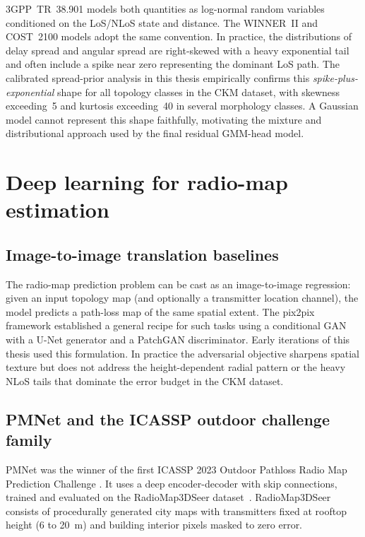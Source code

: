 3GPP~TR~38.901 \cite{tr38901} models both quantities as log-normal random
variables conditioned on the LoS/NLoS state and distance.  The WINNER~II and
COST~2100 models adopt the same convention.  In practice, the distributions of
delay spread and angular spread are right-skewed with a heavy exponential tail
and often include a spike near zero representing the dominant LoS path. The
calibrated spread-prior analysis in this thesis empirically confirms this
\emph{spike-plus-exponential} shape for
all topology classes in the CKM dataset, with skewness exceeding~5 and kurtosis
exceeding~40 in several morphology classes.  A Gaussian model cannot represent
this shape faithfully, motivating the mixture and distributional approach used
by the final residual GMM-head model.

\section{Deep learning for radio-map estimation}
\label{sec:soa_dl}

\subsection{Image-to-image translation baselines}

The radio-map prediction problem can be cast as an image-to-image regression:
given an input topology map (and optionally a transmitter location channel), the
model predicts a path-loss map of the same spatial extent.  The pix2pix framework
\cite{isola2017pix2pix} established a general recipe for such tasks using a
conditional GAN with a U-Net generator and a PatchGAN discriminator.  Early
iterations of this thesis used this formulation.  In practice the adversarial
objective sharpens spatial texture but does not address the height-dependent
radial pattern or the heavy NLoS tails that dominate the error budget in the CKM
dataset.

\subsection{PMNet and the ICASSP outdoor challenge family}

PMNet \cite{pmnet2023} was the winner of the first ICASSP 2023 Outdoor Pathloss
Radio Map Prediction Challenge \cite{icassp2023challenge}.  It uses a deep
encoder-decoder with skip connections, trained and evaluated on the
RadioMap3DSeer dataset~\cite{dataset2212}.  RadioMap3DSeer consists of
procedurally generated city maps with transmitters fixed at rooftop height
(6 to 20~m) and building interior pixels masked to zero error.

